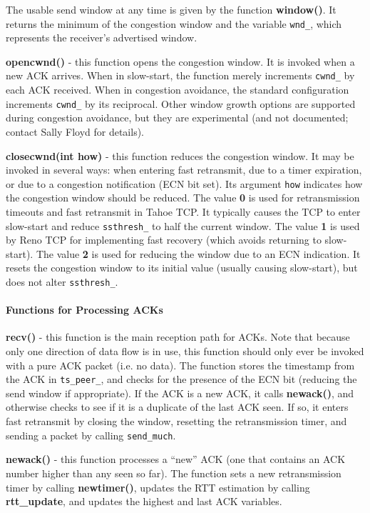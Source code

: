 The usable send window at any time is given by the function {\bf window()}.
It returns the minimum of the congestion window and the variable {\tt wnd\_},
which represents the receiver's advertised window.

{\bf opencwnd()} - this function opens the congestion window.  It is invoked
when a new ACK arrives.
When in slow-start, the function merely increments {\tt cwnd\_} by each
ACK received.
When in congestion avoidance, the standard configuration increments {\tt cwnd\_}
by its reciprocal.
Other window growth options are supported during congestion avoidance,
but they are experimental (and not documented; contact Sally Floyd for
details).

{\bf closecwnd(int how)} - this function reduces the congestion window. It
may be invoked in several ways: when entering fast retransmit, due to
a timer expiration, or due to a congestion notification (ECN bit set).
Its argument {\tt how} indicates how the congestion window should
be reduced.  The value {\bf 0} is used for retransmission timeouts and
fast retransmit in Tahoe TCP.  It typically causes the TCP to enter
slow-start and reduce {\tt ssthresh\_} to half the current window.
The value {\bf 1} is used by Reno TCP for implementing fast recovery
(which avoids returning to slow-start).
The value {\bf 2} is used for reducing the window due to an ECN indication.
It resets the congestion window to its initial value (usually causing
slow-start), but does not alter {\tt ssthresh\_}.

\paragraph{Functions for Processing ACKs}

{\bf recv()} - this function is the main reception path for ACKs.
Note that because only one direction of data flow is in use, this function
should only ever be invoked with a pure ACK packet (i.e. no data).
The function stores the timestamp from the ACK in {\tt ts\_peer\_}, and
checks for the presence of the ECN bit (reducing the send window if
appropriate).
If the ACK is a new ACK, it calls {\bf newack()}, and otherwise
checks to see if it is a duplicate of the last ACK seen.
If so, it enters fast retransmit by closing the window, resetting the
retransmission timer, and sending a packet by calling {\tt send\_much}.

{\bf newack()} - this function processes a ``new'' ACK (one that contains
an ACK number higher than any seen so far).
The function sets a new retransmission timer by calling {\bf newtimer()},
updates the RTT estimation by calling {\bf rtt\_update}, and updates
the highest and last ACK variables.

